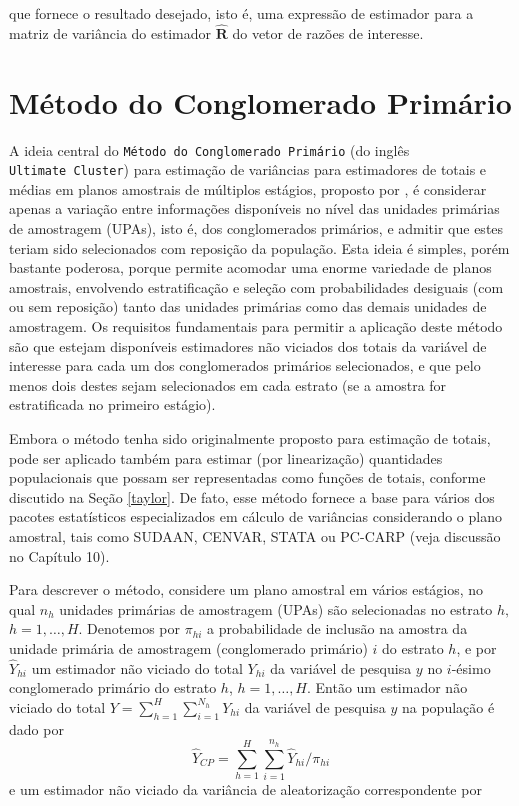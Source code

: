 \documentclass[]{book}
\theoremstyle{definition}
\theoremstyle{definition}
\theoremstyle{definition}
\theoremstyle{remark}
\begin{document}
que fornece o resultado desejado, isto é, uma expressão de estimador
para a matriz de variância do estimador \(\widehat{\mathbf{R}}\) do
vetor de razões de interesse.

\section{Método do Conglomerado
Primário}\label{metodo-do-conglomerado-primario}

A ideia central do \texttt{Método\ do\ Conglomerado\ Primário} (do
inglês \texttt{Ultimate\ Cluster}) para estimação de variâncias para
estimadores de totais e médias em planos amostrais de múltiplos
estágios, proposto por \citep{hansen}, é considerar apenas a variação
entre informações disponíveis no nível das unidades primárias de
amostragem (UPAs), isto é, dos conglomerados primários, e admitir que
estes teriam sido selecionados com reposição da população. Esta ideia é
simples, porém bastante poderosa, porque permite acomodar uma enorme
variedade de planos amostrais, envolvendo estratificação e seleção com
probabilidades desiguais (com ou sem reposição) tanto das unidades
primárias como das demais unidades de amostragem. Os requisitos
fundamentais para permitir a aplicação deste método são que estejam
disponíveis estimadores não viciados dos totais da variável de interesse
para cada um dos conglomerados primários selecionados, e que pelo menos
dois destes sejam selecionados em cada estrato (se a amostra for
estratificada no primeiro estágio).

Embora o método tenha sido originalmente proposto para estimação de
totais, pode ser aplicado também para estimar (por linearização)
quantidades populacionais que possam ser representadas como funções de
totais, conforme discutido na Seção \ref{taylor}. De fato, esse método
fornece a base para vários dos pacotes estatísticos especializados em
cálculo de variâncias considerando o plano amostral, tais como SUDAAN,
CENVAR, STATA ou PC-CARP (veja discussão no Capítulo 10).

Para descrever o método, considere um plano amostral em vários estágios,
no qual \(n_{h}\) unidades primárias de amostragem (UPAs) são
selecionadas no estrato \(h,\) \(h=1,\ldots ,H\). Denotemos por
\(\pi_{hi}\) a probabilidade de inclusão na amostra da unidade primária
de amostragem (conglomerado primário) \(i\) do estrato \(h\), e por
\(\widehat{Y}_{hi}\) um estimador não viciado do total \(Y_{hi}\) da
variável de pesquisa \(y\) no \(i\)-ésimo conglomerado primário do
estrato \(h\), \(h=1,\ldots ,H\). Então um estimador não viciado do
total \(Y=\sum_{h=1}^{H}\sum_{i=1}^{N_{h}}Y_{hi}\) da variável de
pesquisa \(y\) na população é dado por \[
\widehat{Y}_{CP}=\sum_{h=1}^{H}\sum_{i=1}^{n_{h}}\widehat{Y}_{hi}/\pi _{hi} 
\] e um estimador não viciado da variância de aleatorização
correspondente por
\end{document}
